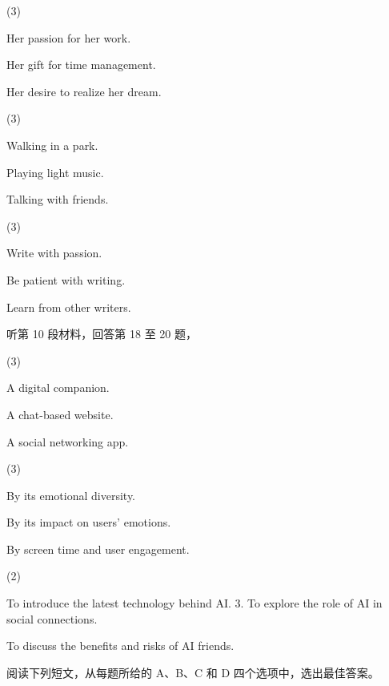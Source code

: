 \documentclass{英语试卷}
\begin{document}
\begin{choices}(3)
  \item Her passion for her work.
  \item Her gift for time management.
  \item Her desire to realize her dream.
\end{choices}
\begin{choices}(3)
  \item Walking in a park.
  \item Playing light music.
  \item Talking with friends.
\end{choices}
\begin{choices}(3)
  \item Write with passion.
  \item Be patient with writing.
  \item Learn from other writers.
\end{choices}
\par 听第 10 段材料，回答第 18 至 20 题，\par
{}
\begin{choices}(3)
  \item A digital companion.
  \item A chat-based website.
  \item A social networking app.
\end{choices}
\begin{choices}(3)
  \item By its emotional diversity.
  \item By its impact on users' emotions.
  \item By screen time and user engagement.
\end{choices}
\begin{choices}(2)
  \item To introduce the latest technology behind AI. 3. To explore the role of AI in social connections.
  \item To discuss the benefits and risks of AI friends.
\end{choices}
\par 阅读下列短文，从每题所给的 A、B、C 和 D 四个选项中，选出最佳答案。\par
\end{document}
